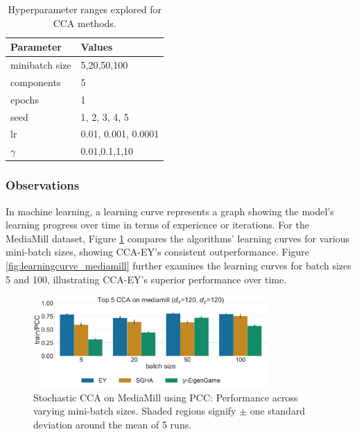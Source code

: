\begin{table}[h!]
    \centering
    \begin{tabular}{|l|l|}
        \hline Parameter             & Values              \\
        \hline minibatch size        & 5,20,50,100         \\
        \hline components            & 5                   \\
        \hline epochs                & 1                   \\
        \hline seed                  & 1, 2, 3, 4, 5       \\
        \hline lr                    & 0.01, 0.001, 0.0001 \\
        \hline $\gamma$\footnotemark & 0.01,0.1,1,10       \\
        \hline
    \end{tabular}
    \caption{Hyperparameter ranges explored for CCA methods.} 
    \label{tab:hyperparameters}
\end{table}

\subsubsection{Observations}
In machine learning, a learning curve represents a graph showing the model's learning progress over time in terms of experience or iterations.
For the MediaMill dataset, Figure \ref{fig:corr_mediamill} compares the algorithms' learning curves for various mini-batch sizes, showing CCA-EY's consistent outperformance. Figure \ref{fig:learningcurve_mediamill} further examines the learning curves for batch sizes 5 and 100, illustrating CCA-EY's superior performance over time.

\begin{figure}
    \centering
    \includegraphics[width=0.8\textwidth]{figures/CCA/mediamill_models_different_batch_sizes}
    \caption{Stochastic CCA on MediaMill using PCC: Performance across varying mini-batch sizes. Shaded regions signify \(\pm\) one standard deviation around the mean of 5 runs.}
    \label{fig:corr_mediamill}
\end{figure}

